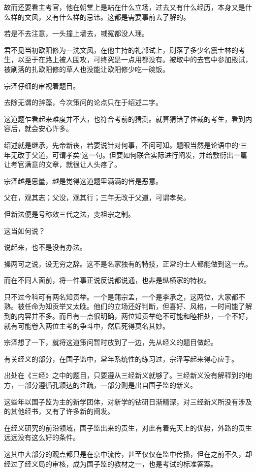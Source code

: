 故而还要看主考官，他在朝堂上是站在什么立场，过去又有什么经历，本身又是什么样的文风，又有什么样的忌讳。这都是需要事前去了解的。

若是不去注意，一头撞上墙去，喊冤都没人理。

君不见当初欧阳修为一洗文风，在他主持的礼部试上，刷落了多少名震士林的考生，以至于在路上被人围攻，可终究是一点用都没有。被取中的去宫中参加殿试，被刷落的扎欧阳修的草人也没能让欧阳修少吃一碗饭。

宗泽仔细的审视着题目。

去除无谓的辞藻，今次策问的论点只在于绍述二字。

这道题乍看起来难度并不大，也符合考前的猜测。就算猜错了体裁的考生，看到内容后，就会安心许多。

绍述就是继承，先帝新丧，若要说针对何事，不问可知。题眼当然是论语中的‘三年无改于父道，可谓孝矣’这一句。但要如何联合实际进行阐发，并给敷衍出一篇让考官满意的文章，就很让人头疼了。

宗泽越是思量，越是觉得这道题里满满的皆是恶意。

父在，观其志；父没，观其行；三年无改于父道，可谓孝矣。

但新法便是号称效三代之法，变祖宗之制。

这当如何说？

说起来，也不是没有办法。

操两可之说，设无穷之辞。这不是名家独有的特技，正常的士人都能做到这一点。

而在不同人面前，将一件事正说反说都说通，也非是纵横家的特权。

只不过今科可有两名知贡举。一个是蒲宗孟，一个是李承之，这两位，大家都不熟。被任命为知贡举又太晚。他们的立场还好判断，但喜好、风格，一时间能了解到的内容并不多。而且有一点很明确，两位知贡举绝不可能和睦相处，一个不好，就有可能卷入两位主考的争斗中，然后死得莫名其妙。

宗泽想了一下，就将这道策问暂时放到了一边，先从经义的题目做起。

有关经义的部分，在国子监中，常年系统性的练习过，宗泽写起来得心应手。

出处在《三经》之中的题目，只要遵从三经新义就够了。三经新义没有解释到的地方，一部分遵循孔颖达的注疏，一部分则是出自国子监的新义。

这些年以国子监为主的新学团体，对新学的钻研日渐精深，对三经新义所没有涉及的其他经书，又有了许多新的阐发。

在经义研究的前沿领域，国子监出来的贡生，对此有着先天上的优势，外路的贡生远远没有这么好的条件。

这其中大部分的观点都只是在京中流传，甚至仅仅在监中传播，但在之前不久，却经过了经义局的审核，成为国子监的教材之一，也是考试的标准答案。

